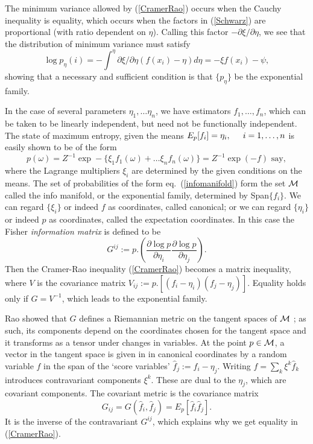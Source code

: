 The minimum variance allowed by (\ref{CramerRao}) occurs when the Cauchy
inequality is equality, which occurs when the factors in (\ref{Schwarz})
are proportional (with ratio dependent on $\eta$). Calling this factor
$-\partial\xi/\partial\eta$, we see that the distribution of minimum
variance must satisfy
\begin{equation}
\log p_\eta(i)=-\int^\eta \partial\xi/\partial\eta(f(x_i)-\eta)d\eta=
-\xi f(x_i)-\psi,
\end{equation}
showing that a necessary and sufficient condition is that $\{p_\eta\}$ be the
exponential family.




In the case of several parameters $\eta_1,\ldots\eta_n$, we have
estimators $f_1,\ldots,f_n$, which can
be taken to be linearly independent, but need not be functionally
independent. The state of maximum entropy, given the means $E_p[f_i]=\eta_i,
\hspace{.2in}i=1,\ldots,n$ is easily shown to be of the form
\begin{equation}
p(\omega)=Z^{-1}\exp-\{\xi_1f_1(\omega)+\ldots\xi_nf_n(\omega)\}=Z^{-1}\exp
(-f)\mbox{ say},
\label{infomanifold}
\end{equation}
where the Lagrange multipliers $\xi_i$ are determined by the given conditions
on the means. The set of probabilities of the form
eq.~(\ref{infomanifold}) form the set ${\cal M}$
called the info manifold, or the exponential family, determined by
Span$\{f_i\}$. We can regard $\{\xi_i\}$ or indeed $f$ as coordinates,
called canonical; or we can regard $\{\eta_i\}$ or indeed $p$ as coordinates,
called the expectation coordinates. In this case the Fisher {\em information
matrix} is defined to be
\begin{equation}
G^{ij}:=p.\left(\frac{\partial \log p}{\partial\eta_i}\frac{\partial\log p}{
\partial\eta_j}\right).
\end{equation}
Then the Cramer-Rao inequality (\ref{CramerRao}) becomes a matrix inequality,
where $V$ is the covariance matrix $V_{ij}:=p.[(f_i-\eta_i)(f_j-\eta_j)]$.
Equality holds only if $G=V^{-1}$, which leads to the exponential family. 

Rao showed that $G$  defines a Riemannian metric on
the tangent spaces of ${\cal M}$ \cite{Ingarden2}; as such, its components
depend on the coordinates chosen for the tangent space and it transforms
as a tensor under changes in variables.
At the point $p\in{\cal M}$, a vector in the tangent space is given in
in canonical coordinates by a random
variable $f$ in the span of the `score variables' $\hat{f}_j:=f_i-\eta_j$.
Writing $f=\sum_k\xi^k\hat{f}_k$ introduces contravariant components $\xi^k$.
These are dual to the $\eta_j$, which are covariant components.
The covariant metric is the covariance matrix
\begin{equation}
G_{ij}=G(\hat{f}_i,\hat{f}_j)=E_p[\hat{f}_i\hat{f}_j].
\end{equation}
It is the inverse of the contravariant $G^{ij}$, which explains why we get
equality in (\ref{CramerRao}).

